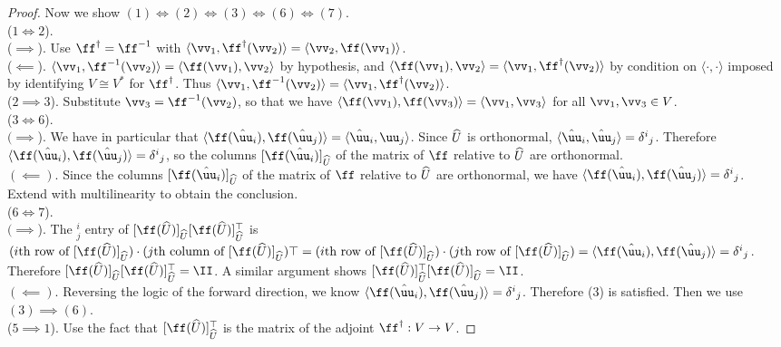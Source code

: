 \begin{proof}
    Now we show $(1) \iff (2) \iff (3) \iff (6) \iff (7)$.
    \mbox{} \\
        ($1 \iff 2$).
        \\ \indent ($\implies$). Use $\ff^\dag = \ff^{-1}$ with $\langle \vv_1, \ff^\dag(\vv_2) \rangle = \langle \vv_2, \ff(\vv_1) \rangle$.
        \\ \indent($\impliedby$). $\langle \vv_1, \ff^{-1}(\vv_2) \rangle = \langle \ff(\vv_1), \vv_2 \rangle$ by hypothesis, and $\langle \ff(\vv_1), \vv_2 \rangle = \langle \vv_1, \ff^\dag(\vv_2) \rangle$ by condition on $\langle \cdot, \cdot \rangle$ imposed by identifying $V \cong V^*$ for $\ff^\dag$. Thus $\langle \vv_1, \ff^{-1}(\vv_2) \rangle = \langle \vv_1, \ff^\dag(\vv_2) \rangle$.
        \\ ($2 \implies 3$). Substitute $\vv_3 = \ff^{-1}(\vv_2)$, so that we have $\langle \ff(\vv_1), \ff(\vv_3) \rangle = \langle \vv_1, \vv_3 \rangle$ for all $\vv_1, \vv_3 \in V$.
        \\ ($3 \iff 6$). 
        \\ \indent $(\implies$). We have in particular that $\langle \ff(\huu_i), \ff(\huu_j) \rangle = \langle \huu_i, {\uu}_j \rangle$. Since $\widehat{U}$ is orthonormal, $\langle \huu_i, \huu_j \rangle = \delta^i{}_j$. Therefore $\langle \ff(\huu_i), \ff(\huu_j) \rangle = \delta^i{}_j$, so the columns $[\ff(\huu_i)]_{\hU}$ of the matrix of $\ff$ relative to $\widehat{U}$ are orthonormal.
        \\ \indent $(\impliedby)$. Since the columns $[\ff(\huu_i)]_{\hU}$ of the matrix of $\ff$ relative to $\widehat{U}$ are orthonormal, we have $\langle \ff(\huu_i), \ff(\huu_j) \rangle = \delta^i{}_j$. Extend with multilinearity to obtain the conclusion.
        \\ ($6 \iff 7$).
        \\ \indent $(\implies$). The $^i_j$ entry of $[\ff(\hU)]_{\hU} [\ff(\hU)]_{\hU}^\top$ is $(\text{$i$th row of $[\ff(\hU)]_{\hU}$}) \cdot (\text{$j$th column of $[\ff(\hU)]_{\hU}$})\top = (\text{$i$th row of $[\ff(\hU)]_{\hU}$}) \cdot (\text{$j$th row of $[\ff(\hU)]_{\hU}$}) = \langle \ff(\huu_i), \ff(\huu_j) \rangle = \delta^i{}_j$. Therefore $[\ff(\hU)]_{\hU} [\ff(\hU)]_{\hU}^\top = \II$. A similar argument shows $[\ff(\hU)]_{\hU}^\top [\ff(\hU)]_{\hU} = \II$.
        \\ \indent $(\impliedby)$. Reversing the logic of the forward direction, we know $\langle \ff(\huu_i), \ff(\huu_j) \rangle = \delta^i{}_j$. Therefore (3) is satisfied. Then we use $(3) \implies (6)$.
        \\ ($5 \implies 1$). Use the fact that $[\ff(\hU)]_{\hU}^\top$ is the matrix of the adjoint $\ff^\dag:V \rightarrow V$.
\end{proof}

